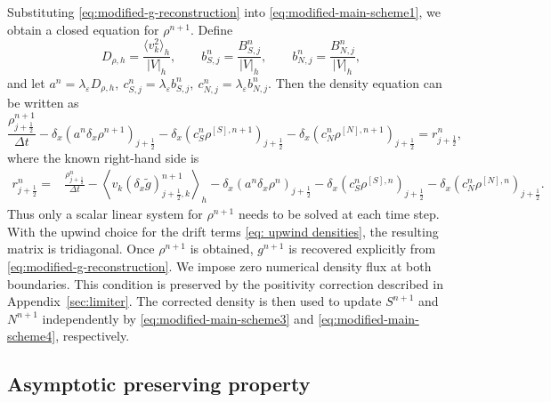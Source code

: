 \documentclass[11pt,twoside]{article}
\numberwithin{equation}{section}
\theoremstyle{plain}
\theoremstyle{nonumberplain}
\begin{document}
{{Substituting \eqref{eq:modified-g-reconstruction} into  \eqref{eq:modified-main-scheme1}, we obtain a closed equation for
\(\rho^{n+1}\). Define
\[
D_{\rho,h}
=
\frac{\langle v_k^2\rangle_h}{|V|_h},
\qquad
b_{S,j}^n
=
\frac{B_{S,j}^n}{|V|_h},
\qquad
b_{N,j}^n
=
\frac{B_{N,j}^n}{|V|_h},
\]
and let
$
a^n=\lambda_\varepsilon D_{\rho,h},
\
c_{S,j}^n=\lambda_\varepsilon b_{S,j}^n,
\
c_{N,j}^n=\lambda_\varepsilon b_{N,j}^n.
$
Then the density equation can be written as
\begin{equation}\label{eq:modified-rho-equation-two-upwind}
\frac{\rho_{j+\frac12}^{n+1}}{\Delta t}
-
\delta_x\left(
a^n\delta_x\rho^{n+1}
\right)_{j+\frac12}
-
\delta_x\left(
c_S^n\rho^{[S],n+1}
\right)_{j+\frac12}
-
\delta_x\left(
c_N^n\rho^{[N],n+1}
\right)_{j+\frac12}
=
r_{j+\frac12}^n,
\end{equation}
where the known right-hand side is
\[
\begin{aligned}
r_{j+\frac12}^n
=&
\frac{\rho_{j+\frac12}^n}{\Delta t}
-
\left\langle
v_k(\delta_x\widetilde g)_{j+\frac12,k}^{n+1}
\right\rangle_h
-
\delta_x\left(
a^n\delta_x\rho^n
\right)_{j+\frac12}
-
\delta_x\left(
c_S^n\rho^{[S],n}
\right)_{j+\frac12}
-
\delta_x\left(
c_N^n\rho^{[N],n}
\right)_{j+\frac12}.
\end{aligned}
\]
Thus only a scalar linear system for \(\rho^{n+1}\) needs to be solved at
each time step. With the upwind choice for the drift terms \eqref{eq: upwind densities}, the
resulting matrix is tridiagonal. Once \(\rho^{n+1}\) is obtained,
\(g^{n+1}\) is recovered explicitly from
\eqref{eq:modified-g-reconstruction}. 
We impose zero numerical density flux at both boundaries.
This condition is preserved by the positivity correction
described in Appendix~\ref{sec:limiter}.
The corrected density is then used to update $S^{n+1}$ and $N^{n+1}$
independently by \eqref{eq:modified-main-scheme3} and
\eqref{eq:modified-main-scheme4}, respectively.



\subsection{Asymptotic preserving property}

}}
\end{document}
